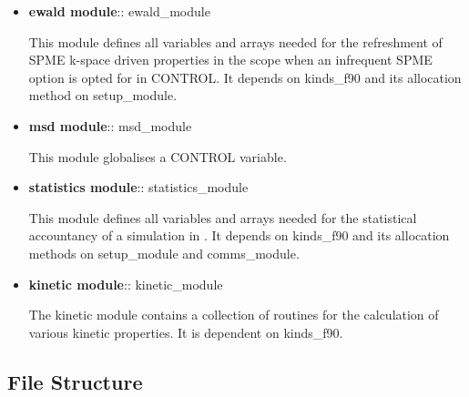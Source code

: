 \begin{itemize}
\item {\bf ewald module}:: {\sc ewald\_module}

This module defines all variables and arrays needed for the
refreshment of SPME k-space driven properties in the \D scope
when an infrequent SPME option is opted for in CONTROL.  It
depends on {\sc kinds\_f90} and its allocation method on
{\sc setup\_module}.

\item {\bf msd module}:: {\sc msd\_module}

This module globalises a CONTROL variable.

\item {\bf statistics module}:: {\sc statistics\_module}

This module defines all variables and arrays needed for the
statistical accountancy of a simulation in \D.  It depends on
{\sc kinds\_f90} and its allocation methods on {\sc setup\_module}
and {\sc comms\_module}.

\item {\bf kinetic module}:: {\sc kinetic\_module}

The kinetic module contains a collection of routines for the
calculation of various kinetic properties.
It is dependent on {\sc kinds\_f90}.

\end{itemize}

\subsection{File Structure}
\label{file-structure}

